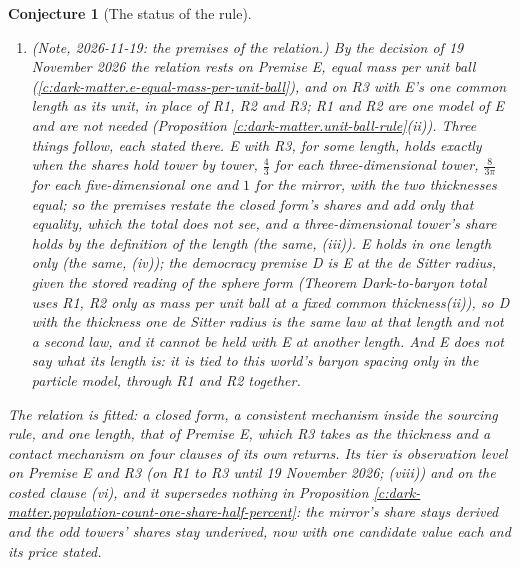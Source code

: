 \documentclass[11pt]{article}
\newtheorem{conjecture}[theorem]{Conjecture}
\theoremstyle{definition}
\theoremstyle{plain}
\begin{document}
\begin{conjecture}[The status of the rule]
\begin{enumerate}
\item[(viii)] \emph{(Note, 2026-11-19: the premises of the relation.)} By the decision of 19 November 2026 the relation rests on Premise E, equal mass per unit ball (\ref{c:dark-matter.e-equal-mass-per-unit-ball}), and on R3 with E's one common length as its unit, in place of R1, R2 and R3; R1 and R2 are one model of E and are not needed (Proposition \ref{c:dark-matter.unit-ball-rule}(ii)). Three things follow, each stated there. E with R3, for some length, holds exactly when the shares hold tower by tower, $\tfrac{4}{3}$ for each three-dimensional tower, $\tfrac{8}{3\pi}$ for each five-dimensional one and $1$ for the mirror, with the two thicknesses equal; so the premises restate the closed form's shares and add only that equality, which the total does not see, and a three-dimensional tower's share holds by the definition of the length (the same, (iii)). E holds in one length only (the same, (iv)); the democracy premise D is E at the de Sitter radius, given the stored reading of the sphere form (Theorem \emph{Dark-to-baryon total uses R1, R2 only as mass per unit ball at a fixed common thickness}(ii)), so D with the thickness one de Sitter radius is the same law at that length and not a second law, and it cannot be held with E at another length. And E does not say what its length is: it is tied to this world's baryon spacing only in the particle model, through R1 and R2 together.
\end{enumerate}
The relation is fitted: a closed form, a consistent mechanism inside the sourcing rule, and one length, that of Premise E, which R3 takes as the thickness and a contact mechanism on four clauses of its own returns. Its tier is observation level on Premise E and R3 (on R1 to R3 until 19 November 2026; (viii)) and on the costed clause (vi), and it supersedes nothing in Proposition \ref{c:dark-matter.population-count-one-share-half-percent}: the mirror's share stays derived and the odd towers' shares stay underived, now with one candidate value each and its price stated.
\end{conjecture}
\end{document}
